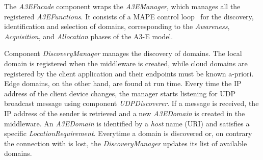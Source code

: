 
The \textit{A3EFacade} component wraps the \textit{A3EManager}, which manages all the registered \textit{A3EFunctions}. It consists of a MAPE control loop~\cite{kephart2003vision} for the discovery, identification and selection of domains, corresponding to the \textit{Awareness}, \textit{Acquisition}, and \textit{Allocation} phases of the A3-E model. 


Component \textit{DiscoveryManager} manages the discovery of domains. The local domain is registered when the middleware is created, while cloud domains are registered by the client application and their endpoints must be known a-priori. Edge domains, on the other hand, are found at run time. Every time the IP address of the client device changes, the manager starts listening for UDP broadcast message using component \textit{UDPDiscoverer}. If a message is received, the IP address of the sender is retrieved and a new \textit{A3EDomain} is created in the middleware. An \textit{A3EDomain} is identified by a \textit{host} name (URI) and satisfies a specific \textit{LocationRequirement}. Everytime a domain is discovered or, on contrary the connection with is lost, the \textit{DiscoveryManager} updates its list of available domains.


